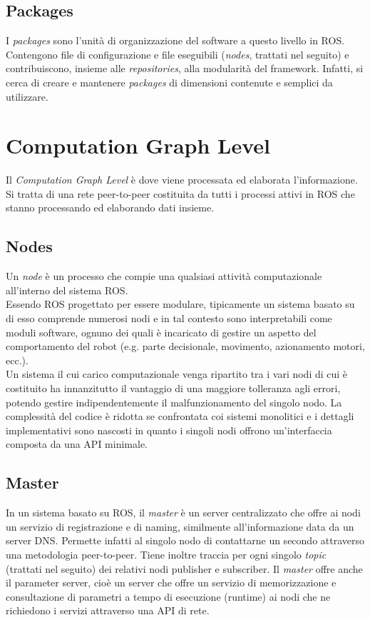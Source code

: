 \subsection{Packages}
I \emph{packages} sono l'unità di organizzazione del software a questo livello in \acs{ROS}. Contengono file di configurazione e file eseguibili (\emph{nodes}, trattati nel seguito) e contribuiscono, insieme alle \emph{repositories}, alla modularità del framework. Infatti, si cerca di creare e mantenere \emph{packages} di dimensioni contenute e semplici da utilizzare.


\section{Computation Graph Level}
Il \emph{Computation Graph Level} è dove viene processata ed elaborata l'informazione. Si tratta di una rete peer-to-peer costituita da tutti i processi attivi in \acs{ROS} che stanno processando ed elaborando dati insieme.

\subsection{Nodes}
Un \emph{node} è un processo che compie una qualsiasi attività computazionale all’interno del sistema \acs{ROS}.\\

Essendo \acs{ROS} progettato per essere modulare, tipicamente un sistema basato su di esso comprende numerosi nodi e in tal contesto sono interpretabili come moduli software, ognuno dei quali è incaricato di gestire un aspetto del comportamento del robot (e.g. parte decisionale, movimento, azionamento motori, ecc.).\\

Un sistema il cui carico computazionale venga ripartito tra i vari nodi di cui è costituito ha innanzitutto il vantaggio di una maggiore tolleranza agli errori, potendo gestire indipendentemente il malfunzionamento del singolo nodo. La complessità del codice è ridotta se confrontata coi sistemi monolitici e i dettagli implementativi sono nascosti in quanto i singoli nodi offrono un’interfaccia composta da una \ac{API} minimale.

\subsection{Master}
In un sistema basato su ROS, il \emph{master} è un server centralizzato che offre ai nodi un servizio di registrazione e di naming, similmente all’informazione data da un server \ac{DNS}. Permette infatti al singolo nodo di contattarne un secondo attraverso una metodologia peer-to-peer. Tiene inoltre traccia per ogni singolo \emph{topic} (trattati nel seguito) dei relativi nodi publisher e subscriber. Il \emph{master} offre anche il parameter server, cioè un server che offre un servizio di memorizzazione e consultazione di parametri a tempo di esecuzione (runtime) ai nodi che ne richiedono i servizi attraverso una \acs{API} di rete.
 
